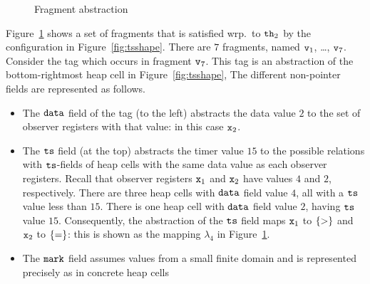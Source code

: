 \begin{figure}
\center
	
\caption{Fragment abstraction}
\label{fig:tsviewshape}
\end{figure} 

Figure~\ref{fig:tsviewshape} shows a set of fragments that is
satisfied wrp.\ to ${\tt th}_2$ by the configuration in Figure~\ref{fig:tsshape}.
There are $7$ fragments, named $\mathtt{v}_1$, \ldots , $\mathtt{v}_7$.
Consider the tag which occurs in fragment $\mathtt{v}_7$.
This tag is an abstraction of the
bottom-rightmost heap cell in Figure~\ref{fig:tsshape},
The different non-pointer fields are represented as follows.
\begin{itemize}
\item The $\tt data$ field of the tag (to the left) abstracts the data value
  $2$ to the set of observer registers with that value: in this case
  $\mathtt{x}_2$.
\item The $\tt ts$ field (at the top) abstracts the timer value $15$ to
  the possible relations with $\tt ts$-fields of heap cells with the same
  data value as each observer registers. Recall that observer registers
  $\mathtt{x}_1$ and $\mathtt{x}_2$ have values $4$ and $2$, respectively. There are
  three heap cells with $\tt data$ field value $4$, all with a $\tt ts$
  value less than $15$. There is one heap cell with
  $\tt data$ field value $2$, having $\tt ts$ value $15$.
  Consequently, the abstraction of the $\tt ts$ field maps $\mathtt{x}_1$ to
  $\left\{>\right\}$ and $\mathtt{x}_2$ to $\left\{=\right\}$: this is shown as the mapping
  $\lambda_4$ in Figure~\ref{fig:tsviewshape}.
\item The $\tt mark$ field assumes values from a small finite domain and
  is represented precisely as in concrete heap cells
\end{itemize}


